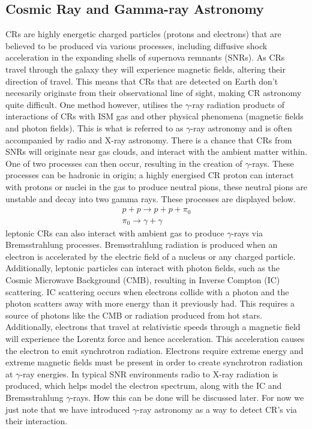 \documentclass[12pt,a4paper]{article}
\begin{document}
\subsection{Cosmic Ray and Gamma-ray Astronomy}
CRs are highly energetic charged particles (protons and electrons) that are believed to be produced via various processes, including diffusive shock acceleration in the expanding shells of supernova remnants (SNRs). As CRs travel through the galaxy they will experience magnetic fields, altering their direction of travel. This means that CRs that are detected on Earth don't necesarily originate from their observational line of sight, making CR astronomy quite difficult. One method however, utilises the $\gamma$-ray radiation products of interactions of CRs with ISM gas and other physical phenomena (magnetic fields and photon fields). This is what is referred to as $\gamma$-ray astronomy and is often accompanied by radio and X-ray astronomy. There is a chance that CRs from SNRs will originate near gas clouds, and interact with the ambient matter within. One of two processes can then occur, resulting in the creation of $\gamma$-rays. These processes can be hadronic in origin; a highly energised CR proton can interact with protons or nuclei in the gas to produce neutral pions, these neutral pions are unstable and decay into two gamma rays. These processes are displayed below. 
\begin{equation*}
\begin{split}
p + p \rightarrow p + p + \pi_{0} \\
\pi_{0} \rightarrow \gamma + \gamma
\end{split}
\end{equation*}
leptonic CRs can also interact with ambient gas to produce $\gamma$-rays via Bremsstrahlung processes. Bremsstrahlung radiation is produced when an electron is accelerated by the electric field of a nucleus or any charged particle. Additionally, leptonic particles can interact with photon fields, such as the Cosmic Microwave Background (CMB), resulting in Inverse Compton (IC) scattering. IC scattering occurs when electrons collide with a photon and the photon scatters away with more energy than it previously had. This requires a source of photons like the CMB or radiation produced from hot stars. Additionally, electrons that travel at relativistic speeds through a magnetic field will experience the Lorentz force and hence acceleration. This acceleration causes the electron to emit synchrotron radiation. Electrons require extreme energy and extreme magnetic fields must be present in order to create synchrotron radiation at $\gamma$-ray energies. In typical SNR environments radio to X-ray radiation is produced, which helps model the electron spectrum, along with the IC and Bremsstrahlung $\gamma$-rays. How this can be done will be discussed later. For now we just note that we have introduced $\gamma$-ray astronomy as a way to detect CR's via their interaction.  \\ 
\end{document}
